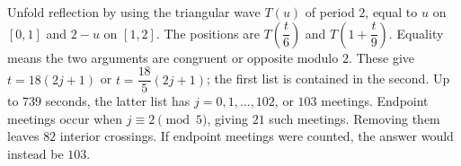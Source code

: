 Unfold reflection by using the triangular wave $T(u)$ of period $2$, equal to $u$ on $[0,1]$ and $2-u$ on $[1,2]$. The positions are $T(\dfrac{t}{6})$ and $T(1+\dfrac{t}{9})$. Equality means the two arguments are congruent or opposite modulo $2$. These give $t=18(2j+1)$ or $t=\dfrac{18}{5}(2j+1)$; the first list is contained in the second. Up to $739$ seconds, the latter list has $j=0,1,\ldots,102$, or $103$ meetings. Endpoint meetings occur when $j\equiv2\pmod5$, giving $21$ such meetings. Removing them leaves $\boxed{82}$ interior crossings. If endpoint meetings were counted, the answer would instead be $103$.
